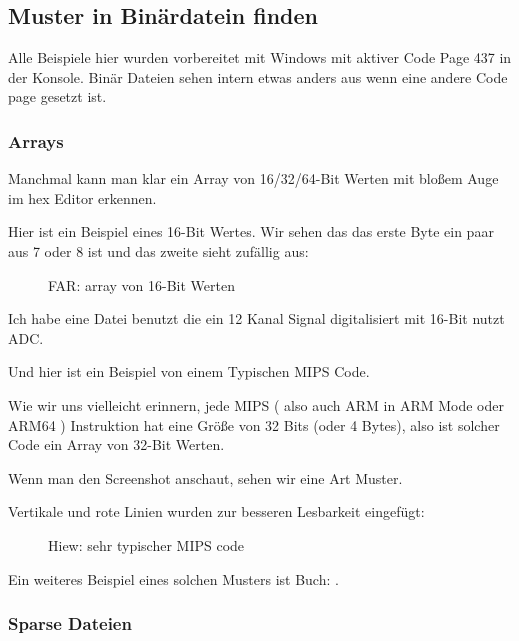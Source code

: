 
\subsection{ Muster in Bin\"ardatein finden}

Alle Beispiele hier wurden vorbereitet mit Windows mit aktiver Code Page 437
in der Konsole.
Bin\"ar Dateien sehen intern etwas anders aus wenn eine andere Code page gesetzt ist.

\clearpage
\subsubsection{Arrays}

Manchmal kann man klar ein Array von 16/32/64-Bit Werten mit bloßem Auge im hex Editor erkennen.

Hier ist ein Beispiel eines 16-Bit Wertes.
Wir sehen das das erste Byte ein paar aus 7 oder 8 ist und das zweite sieht
zuf\"allig aus:

\begin{figure}[H]
\centering
{}
\caption{FAR: array von 16-Bit Werten}
\end{figure}

Ich habe eine Datei benutzt die ein 12 Kanal Signal digitalisiert mit 16-Bit nutzt \ac{ADC}.

\clearpage
{}
\par Und hier ist ein Beispiel von einem Typischen MIPS Code.

Wie wir uns vielleicht erinnern, jede MIPS ( also auch ARM in ARM Mode oder ARM64 ) Instruktion hat eine Gr\"oße von 32 Bits (oder 4 Bytes),
also ist solcher Code ein Array von 32-Bit Werten. 

Wenn man den Screenshot anschaut, sehen wir eine Art Muster.

Vertikale und rote Linien wurden zur besseren Lesbarkeit eingef\"ugt:

\begin{figure}[H]
\centering
{}
\caption{Hiew: sehr typischer MIPS code}
\end{figure}

Ein weiteres Beispiel eines solchen Musters ist Buch:
.

\clearpage
\subsubsection{Sparse Dateien} 

